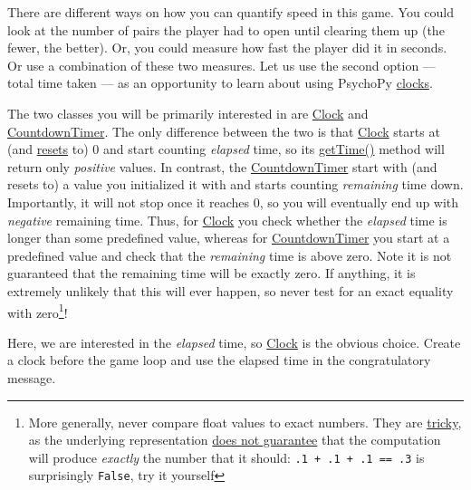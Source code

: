 \documentclass[
]{book}
\begin{document}
There are different ways on how you can quantify speed in this game. You could look at the number of pairs the player had to open until clearing them up (the fewer, the better). Or, you could measure how fast the player did it in seconds. Or use a combination of these two measures. Let us use the second option --- total time taken --- as an opportunity to learn about using PsychoPy \href{https://psychopy.org/api/clock.html}{clocks}.

The two classes you will be primarily interested in are \href{https://psychopy.org/api/clock.html\#psychopy.clock.Clock}{Clock} and \href{https://psychopy.org/api/clock.html\#psychopy.clock.CountdownTimer}{CountdownTimer}. The only difference between the two is that \href{https://psychopy.org/api/clock.html\#psychopy.clock.Clock}{Clock} starts at (and \href{https://psychopy.org/api/clock.html\#psychopy.clock.Clock.reset}{resets} to) 0 and start counting \emph{elapsed} time, so its \href{https://psychopy.org/api/clock.html\#psychopy.clock.MonotonicClock.getTime}{getTime()} method will return only \emph{positive} values. In contrast, the \href{https://psychopy.org/api/clock.html\#psychopy.clock.CountdownTimer}{CountdownTimer} start with (and resets to) a value you initialized it with and starts counting \emph{remaining} time down. Importantly, it will not stop once it reaches 0, so you will eventually end up with \emph{negative} remaining time. Thus, for \href{https://psychopy.org/api/clock.html\#psychopy.clock.Clock}{Clock} you check whether the \emph{elapsed} time is longer than some predefined value, whereas for \href{https://psychopy.org/api/clock.html\#psychopy.clock.CountdownTimer}{CountdownTimer} you start at a predefined value and check that the \emph{remaining} time is above zero. Note it is not guaranteed that the remaining time will be exactly zero. If anything, it is extremely unlikely that this will ever happen, so never test for an exact equality with zero\footnote{More generally, never compare float values to exact numbers. They are \href{http://www.lahey.com/float.htm}{tricky}, as the underlying representation \href{https://docs.python.org/3/tutorial/floatingpoint.html}{does not guarantee} that the computation will produce \emph{exactly} the number that it should: \texttt{.1\ +\ .1\ +\ .1\ ==\ .3} is surprisingly \texttt{False}, try it yourself}!

Here, we are interested in the \emph{elapsed} time, so \href{https://psychopy.org/api/clock.html\#psychopy.clock.Clock}{Clock} is the obvious choice. Create a clock before the game loop and use the elapsed time in the congratulatory message.
\end{document}
